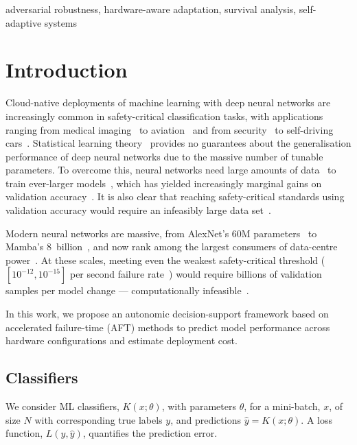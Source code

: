 \documentclass[conference]{IEEEtran}%
\begin{document}
\begin{IEEEkeywords}
adversarial robustness, hardware-aware adaptation, survival analysis, self-adaptive systems
\end{IEEEkeywords}




\section{Introduction}
Cloud-native deployments of machine learning with deep neural networks are increasingly common in safety-critical classification tasks, with applications ranging from medical imaging~\cite{ai_medical_imaging} to aviation~\cite{ai_aviation} and from security~\cite{ai_security,ai_luggage,ai_prison} to self-driving cars~\cite{ai_automotive}.
Statistical learning theory~\cite{vcdimension,shalev2014understanding} provides no guarantees about the generalisation performance of deep neural networks due to the massive number of tunable parameters.
To overcome this, neural networks need large amounts of data~\cite{desislavov2021compute,bailly2022effects} to train ever-larger models~\cite{desislavov2021compute}, which has yielded increasingly marginal gains on validation accuracy~\cite{sun2017revisiting}.
It is also clear that reaching safety-critical standards using validation accuracy would require an infeasibly large data set~\cite{meyers}.

Modern neural networks are massive, from AlexNet's 60M parameters~\cite{alom2018history} to Mamba's 8~billion~\cite{mamba}, and now rank among the largest consumers of data-centre power~\cite{msft_water}. 
At these scales, meeting even the weakest safety-critical threshold ($[10^{-12}, 10^{-15}]$ per second failure rate~\cite{IEC61508,iso26262,aviation_software,safetyframework}) would require billions of validation samples per model change --- computationally infeasible~\cite{meyers}.

In this work, we propose an autonomic decision-support framework based on accelerated failure-time (AFT) methods to predict model performance across hardware configurations and estimate deployment cost.

\subsection{Classifiers}

We consider ML classifiers, $K(x;\theta)$, with parameters $\theta$, for a mini-batch, $x$, of size $N$ with corresponding true labels $y$, and predictions $\hat{y} = K(x;\theta)$. 
A loss function, $L(y,\hat{y})$, quantifies the prediction error.
\end{document}
